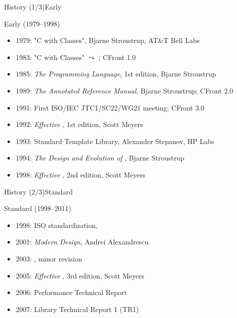 \begin{frame}{\CCLang History (1/3)}{Early \CCLang}
  \begin{block}{Early \CCLang (1979--1998)}
    \begin{itemize}
    \item
      1979: "C with Classes", Bjarne Stroustrup, AT\&T Bell Labs
    \item
      1983: "C with Classes" $\leadsto$ \CCLang; CFront 1.0
    \item
      1985: \emph{The \CCLang Programming Language}, 1st edition, Bjarne Stroustrup
    \item
      1989: \emph{The Annotated \CCLang Reference Manual}, Bjarne Stroustrup; CFront 2.0
    \item
      1991: First ISO/IEC JTC1/SC22/WG21 meeting; CFront 3.0
    \item
      1992: \emph{Effective \CCLang}, 1st edition, Scott Meyers
    \item
      1993: Standard Template Library, Alexander Stepanov, HP Labs
    \item
      1994: \emph{The Design and Evolution of \CCLang}, Bjarne Stroustrup
    \item
      1998: \emph{Effective \CCLang}, 2nd edition, Scott Meyers
    \end{itemize}
  \end{block}
\end{frame}

\begin{frame}{\CCLang History (2/3)}{Standard \CCLang}
  \begin{block}{Standard \CCLang (1998--2011)}
    \begin{itemize}
    \item
      1998: ISO standardization, 
    \item
      2001: \emph{Modern \CCLang Design}, Andrei Alexandrescu
    \item
      2003: , minor revision
    \item
      2005: \emph{Effective \CCLang}, 3rd edition, Scott Meyers
    \item
      2006: Performance Technical Report
    \item
      2007: Library Technical Report 1 (TR1)
    \end{itemize}
  \end{block}
\end{frame}

